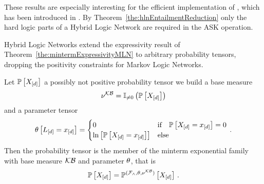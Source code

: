 These results are especially interesting for the efficient implementation of , which has been introduced in .
By Theorem~\ref{the:hlnEntailmentReduction} only the hard logic parts of a Hybrid Logic Network are required in the ASK operation.


Hybrid Logic Networks extend the expressivity result of Theorem~\ref{the:mintermExpressivityMLN} to arbitrary probability tensors, dropping the positivity constraints for Markov Logic Networks.

\begin{theorem}
    \label{the:mintermExpressivityHLN}
    Let $\mathbb{P}\left[X_{[d]}\right]$ a possibly not positive probability tensor we build a base measure
    \[ \nu^{\mathcal{KB}} = \mathbb{I}_{\neq0}\left(\mathbb{P}\left[X_{[d]}\right]\right) \]
    and a parameter tensor
    \begin{align*}
        \theta\left[L_{[d]}=x_{[d]}\right]
        = \begin{cases}
              0 & \text{if} \quad \mathbb{P}\left[X_{[d]}=x_{[d]}\right] = 0  \\
              \ln \left[ \mathbb{P}\left[X_{[d]}=x_{[d]}\right] \right] & \text{else}
        \end{cases} \, .
    \end{align*}
    Then the probability tensor is the member of the minterm exponential family with base measure $\mathcal{KB}$ and parameter $\theta$, that is
    \[ \mathbb{P}\left[X_{[d]}\right] = \mathbb{P}^{(\mathcal{F}_{\land},\theta,\nu^{\mathcal{KB}})}\left[X_{[d]}\right] \, . \]
\end{theorem}
